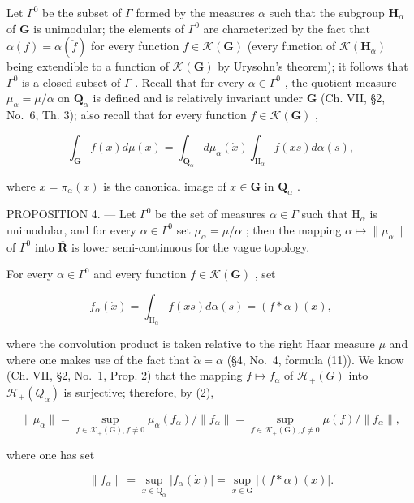 Let \(\Gamma^0\) be the subset of \(\Gamma\) formed by the measures \(\alpha\) such that the subgroup \(\mathbf{H}_{\alpha}\) of \(\mathbf{G}\) is unimodular; the elements of \(\Gamma^0\) are characterized by the fact that \(\alpha(f) = \alpha(\check{f})\) for every function \(f \in \mathcal{K}(\mathbf{G})\) (every function of \(\mathcal{K}(\mathbf{H}_{\alpha})\) being extendible to a function of \(\mathcal{K}(\mathbf{G})\) by Urysohn's theorem); it follows that \(\Gamma^0\) is a closed subset of \(\Gamma\) . Recall that for every \(\alpha \in \Gamma^0\) , the quotient measure \(\mu_{\alpha} = \mu / \alpha\) on \(\mathbf{Q}_{\alpha}\) is defined and is relatively invariant under \(\mathbf{G}\) (Ch. VII, §2, No.~6, Th. 3); also recall that for every function \(f \in \mathcal{K}(\mathbf{G})\) ,

\[
\int_ {\mathbf {G}} f (x) d \mu (x) = \int_ {\mathbf {Q} _ {\alpha}} d \mu_ {\alpha} (\dot {x}) \int_ {\mathrm{H} _ {\alpha}} f (x s) d \alpha (s),\tag{2}
\]

where \(\dot{x} = \pi_{\alpha}(x)\) is the canonical image of \(x\in \mathbf{G}\) in \(\mathbf{Q}_{\alpha}\) .

PROPOSITION 4. --- Let \(\Gamma^0\) be the set of measures \(\alpha \in \Gamma\) such that \(\mathrm{H}_{\alpha}\) is unimodular, and for every \(\alpha \in \Gamma^0\) set \(\mu_{\alpha} = \mu / \alpha\) ; then the mapping \(\alpha \mapsto \| \mu_{\alpha} \|\) of \(\Gamma^0\) into \(\overline{\mathbf{R}}\) is lower semi-continuous for the vague topology.

For every \(\alpha \in \Gamma^0\) and every function \(f\in \mathcal{K}(\mathbf{G})\) , set

\[
f _ {\alpha} (\dot {x}) = \int_ {\mathrm{H} _ {\alpha}} f (x s) d \alpha (s) = (f * \alpha) (x),
\]

where the convolution product is taken relative to the right Haar measure \(\mu\) and where one makes use of the fact that \(\check{\alpha} = \alpha\) (§4, No.~4, formula (11)). We know (Ch. VII, §2, No.~1, Prop. 2) that the mapping \(f \mapsto f_{\alpha}\) of \(\mathcal{H}_{+}(G)\) into \(\mathcal{H}_{+}(Q_{\alpha})\) is surjective; therefore, by (2),

\[
\| \mu_ {\alpha} \| = \sup _ {f \in \mathcal {K} _ {+} (\mathrm{G}), f \neq 0} \mu_ {\alpha} (f _ {\alpha}) / \| f _ {\alpha} \| = \sup _ {f \in \mathcal {K} _ {+} (\mathrm{G}), f \neq 0} \mu (f) / \| f _ {\alpha} \|,
\]

where one has set

\[
\left\| f _ {\alpha} \right\| = \sup _ {\dot {x} \in \mathrm{Q} _ {\alpha}} | f _ {\alpha} (\dot {x}) | = \sup _ {x \in \mathrm{G}} | (f * \alpha) (x) |.\tag{3}
\]

